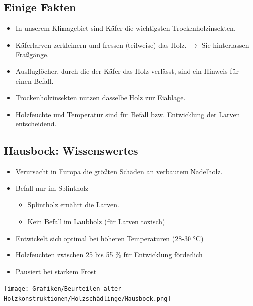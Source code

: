 \documentclass[fleqn,twoside]{article}
\begin{document}
    \subsection{Einige Fakten}
        \begin{itemize}
            \item In unserem Klimagebiet sind Käfer die wichtigsten Trockenholzinsekten.
            \item Käferlarven zerkleinern und fressen (teilweise) das Holz. $\rightarrow$ Sie hinterlassen Fraßgänge.
            \item Ausfluglöcher, durch die der Käfer das Holz verlässt, sind ein Hinweis für einen Befall.
            \item Trockenholzinsekten nutzen dasselbe Holz zur Eiablage.
            \item Holzfeuchte und Temperatur sind für Befall bzw. Entwicklung der Larven entscheidend.
        \end{itemize}
        
    \subsection{Hausbock: Wissenswertes}
    \begin{minipage}{0.75\textwidth}
        \begin{itemize}
            \item Verursacht in Europa die größten Schäden an verbautem Nadelholz.
            \item Befall nur im Splintholz
                \begin{itemize}
                    \item Splintholz ernährt die Larven.
                    \item Kein Befall im Laubholz (für Larven toxisch)
                \end{itemize}
            \item Entwickelt sich optimal bei höheren Temperaturen (28-30 °C)
            \item Holzfeuchten zwischen 25 bis 55 \% für Entwicklung förderlich
            \item Pausiert bei starkem Frost
        \end{itemize}
    \end{minipage}
    \begin{minipage}{0.25\textwidth}
        \texttt{[image: Grafiken/Beurteilen alter Holzkonstruktionen/Holzschädlinge/Hausbock.png]}
    \end{minipage}
        
\end{document}
